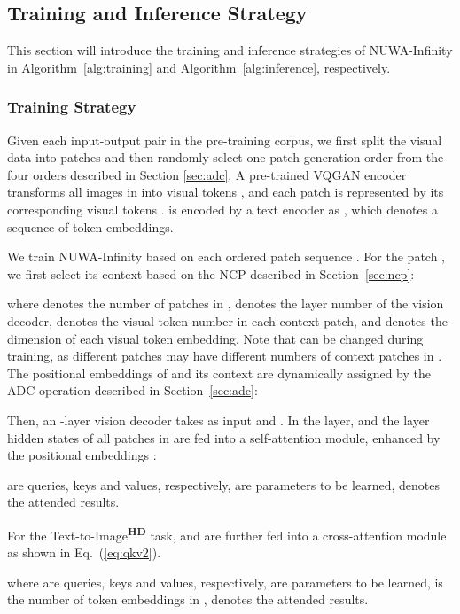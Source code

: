 \documentclass{article}
\begin{document}
\subsection{Training and Inference Strategy}\label{sec:train}
This section will introduce the training and inference strategies of NUWA-Infinity in Algorithm~\ref{alg:training} and Algorithm~\ref{alg:inference}, respectively.


\subsubsection{Training Strategy}\label{sec:ts}

Given each input-output pair  in the pre-training corpus, we first split the visual data  into patches and then randomly select one patch generation order  from the four orders  described in Section  \ref{sec:adc}. A pre-trained VQGAN encoder \cite{esserTamingTransformersHighResolution2021} transforms all images in  into visual tokens , and each patch  is represented by its corresponding visual tokens .  is encoded by a text encoder as , which denotes a sequence of token embeddings.



We train NUWA-Infinity based on each ordered patch sequence . For the  patch , we first select its context  based on the NCP described in Section~\ref{sec:ncp}:

where  denotes the number of patches in ,  denotes the layer number of the vision decoder,  denotes the visual token number in each context patch, and  denotes the dimension of each visual token embedding. Note that  can be changed during training, as different patches may have different numbers of context patches in . The positional embeddings  of  and its context  are dynamically assigned by the ADC operation described in Section~\ref{sec:adc}:


Then, an -layer vision decoder takes as input  and . In the  layer,  and the  layer hidden states  of all patches in  are fed into a self-attention module, enhanced by the positional embeddings :
 
 are queries, keys and values, respectively,  are parameters to be learned,  denotes the attended results.

For the Text-to-Image\textsuperscript{\textbf{HD}} task,  and  are further fed into a cross-attention module as shown in Eq.~(\ref{eq:qkv2}).

where  are queries, keys and values, respectively,  are parameters to be learned,  is the number of token embeddings in ,  denotes the attended results.
\end{document}
